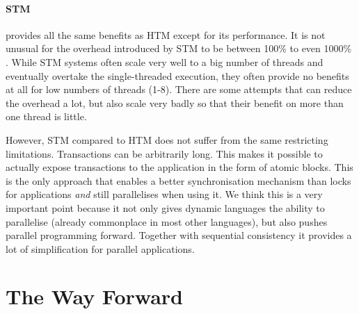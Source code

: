 \documentclass{sigplanconf}
\begin{document}

\paragraph{STM} provides all the same benefits as HTM except for its
performance.  It is not unusual for the overhead introduced by STM to
be between 100\% to even 1000\% \cite{cascaval08,drago11}. While STM
systems often scale very well to a big number of threads and
eventually overtake the single-threaded execution, they often provide
no benefits at all for low numbers of threads (1-8). There are some
attempts \cite{warmhoff13} that can reduce the overhead a lot, but
also scale very badly so that their benefit on more than one thread is
little.

However, STM compared to HTM does not suffer from the same restricting
limitations. Transactions can be arbitrarily long.  This makes it
possible to actually expose transactions to the application in the
form of atomic blocks. This is the only approach that enables a better
synchronisation mechanism than locks for applications \emph{and} still
parallelises when using it. We think this is a very important point
because it not only gives dynamic languages the ability to parallelise
(already commonplace in most other languages), but also pushes
parallel programming forward. Together with sequential consistency it
provides a lot of simplification for parallel applications.



\section{The Way Forward}
\end{document}
